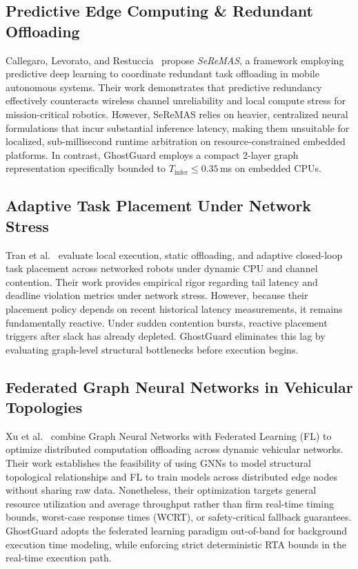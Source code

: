 \documentclass[10pt,conference]{IEEEtran}
\begin{document}
\subsection{Predictive Edge Computing \& Redundant Offloading}
Callegaro, Levorato, and Restuccia~\cite{paper_callegaro2021} propose \textit{SeReMAS}, a framework employing predictive deep learning to coordinate redundant task offloading in mobile autonomous systems. Their work demonstrates that predictive redundancy effectively counteracts wireless channel unreliability and local compute stress for mission-critical robotics. However, SeReMAS relies on heavier, centralized neural formulations that incur substantial inference latency, making them unsuitable for localized, sub-millisecond runtime arbitration on resource-constrained embedded platforms. In contrast, GhostGuard employs a compact 2-layer graph representation specifically bounded to $T_{\text{infer}} \le 0.35$\,ms on embedded CPUs.

\subsection{Adaptive Task Placement Under Network Stress}
Tran et al.~\cite{paper_tran2026} evaluate local execution, static offloading, and adaptive closed-loop task placement across networked robots under dynamic CPU and channel contention. Their work provides empirical rigor regarding tail latency and deadline violation metrics under network stress. However, because their placement policy depends on recent historical latency measurements, it remains fundamentally reactive. Under sudden contention bursts, reactive placement triggers after slack has already depleted. GhostGuard eliminates this lag by evaluating graph-level structural bottlenecks before execution begins.

\subsection{Federated Graph Neural Networks in Vehicular Topologies}
Xu et al.~\cite{paper_xu2024} combine Graph Neural Networks with Federated Learning (FL) to optimize distributed computation offloading across dynamic vehicular networks. Their work establishes the feasibility of using GNNs to model structural topological relationships and FL to train models across distributed edge nodes without sharing raw data. Nonetheless, their optimization targets general resource utilization and average throughput rather than firm real-time timing bounds, worst-case response times (WCRT), or safety-critical fallback guarantees. GhostGuard adopts the federated learning paradigm out-of-band for background execution time modeling, while enforcing strict deterministic RTA bounds in the real-time execution path.
\end{document}
